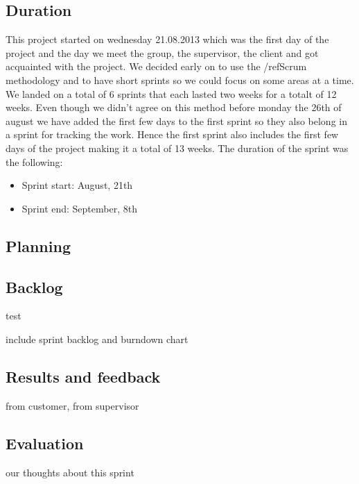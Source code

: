 \subsection{Duration}
This project started on wednesday 21.08.2013 which was the first day of the project and the day we meet the group, the supervisor, the client and got acquainted with the project. We decided early on to use the /ref{Scrum} methodology and to have short sprints so we could focus on some areas at a time. We landed on a total of 6 sprints that each lasted two weeks for a totalt of 12 weeks. Even though we didn't agree on this method before monday the 26th of august we have added the first few days to the first sprint so they also belong in a sprint for tracking the work. Hence the first sprint also includes the first few days of the project making it a total of 13 weeks. 
The duration of the sprint was the following:
\begin{itemize}
\item Sprint start: August, 21th
\item Sprint end: September, 8th
\end{itemize}

\subsection{Planning} 

\subsection{Backlog}

\begin{description}
\item[test]
\end{description}


include sprint backlog and burndown chart
\subsection{Results and feedback}
from customer, from supervisor
\subsection{Evaluation}
our thoughts about this sprint
